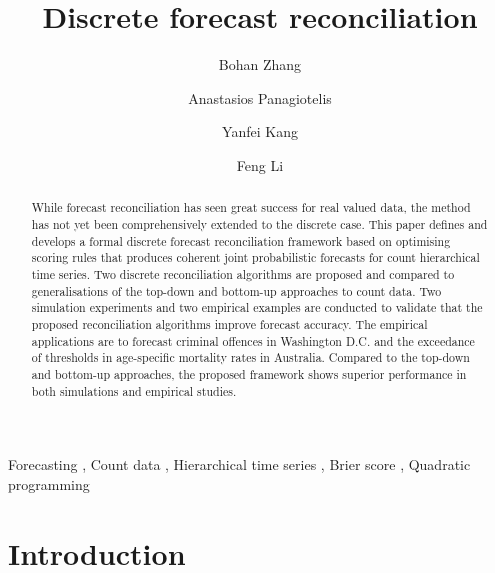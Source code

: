 \documentclass[a4paper,review,12pt,authoryear]{elsarticle}
\begin{document}
\begin{frontmatter}

  \title{Discrete forecast reconciliation}

  \author[label1]{Bohan Zhang}
  \address[label1]{School of Economics and Management, Beihang University, Beijing, China}
  \author[label2]{Anastasios Panagiotelis}
  \author[label1]{Yanfei Kang}
  
  \author[label3]{Feng Li}

  \address[label2]{The University of Sydney Business School, NSW 2006, Australia}
  \address[label3]{School of Statistics and Mathematics, Central University of Finance and Economics, Beijing, China}

  \begin{abstract}

    While forecast reconciliation has seen great success for real valued data, the method has not yet been comprehensively extended to the discrete case. This paper defines and develops a formal discrete forecast reconciliation framework based on optimising scoring rules that produces coherent joint probabilistic forecasts for count hierarchical time series.
    Two discrete reconciliation algorithms are proposed and compared to generalisations of the top-down and bottom-up approaches to count data. Two simulation experiments and two empirical examples are conducted to validate that the proposed reconciliation algorithms improve forecast accuracy. The empirical applications are to forecast  criminal offences in Washington D.C. and the exceedance of thresholds in age-specific mortality rates in Australia. Compared to the top-down and bottom-up approaches, the proposed framework shows superior performance in both simulations and empirical studies.
    
  \end{abstract}

  \begin{keyword}
  Forecasting \sep
  Count data \sep
  Hierarchical time series \sep
  Brier score \sep
  Quadratic programming
  \end{keyword}
  
\end{frontmatter}

\newpage

\section{Introduction}
\end{document}

